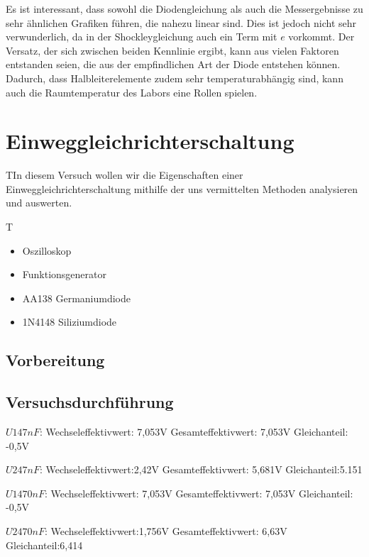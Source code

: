 \documentclass{article}
\begin{document}
Es ist interessant, dass sowohl die Diodengleichung als auch die Messergebnisse zu sehr ähnlichen Grafiken führen, die nahezu linear sind. Dies ist jedoch nicht sehr verwunderlich, da in der Shockleygleichung auch ein Term mit $e$ vorkommt. Der Versatz, der sich zwischen beiden Kennlinie ergibt, kann aus vielen Faktoren entstanden seien, die aus der empfindlichen Art der Diode entstehen können. Dadurch, dass Halbleiterelemente zudem sehr temperaturabhängig sind, kann auch die Raumtemperatur des Labors eine Rollen spielen.

\newpage

\section{Einweggleichrichterschaltung}
\begin{task}
  TIn diesem Versuch wollen wir die Eigenschaften einer Einweggleichrichterschaltung mithilfe der uns 
  vermittelten Methoden analysieren und auswerten.
\end{task}

\begin{devlist}
  T\begin{itemize}
    \item Oszilloskop
    \item Funktionsgenerator
    \item AA138 Germaniumdiode
    \item 1N4148 Siliziumdiode
  \end{itemize}
\end{devlist}

\subsection{Vorbereitung}

\subsection{Versuchsdurchführung}
$U1 47nF$:
Wechseleffektivwert: 7,053V
Gesamteffektivwert: 7,053V
Gleichanteil: -0,5V

$U2 47nF$:
Wechseleffektivwert:2,42V
Gesamteffektivwert: 5,681V
Gleichanteil:5.151

$U1 470nF$:
Wechseleffektivwert: 7,053V
Gesamteffektivwert: 7,053V
Gleichanteil: -0,5V

$U2 470nF$:
Wechseleffektivwert:1,756V
Gesamteffektivwert: 6,63V
Gleichanteil:6,414
\end{document}
